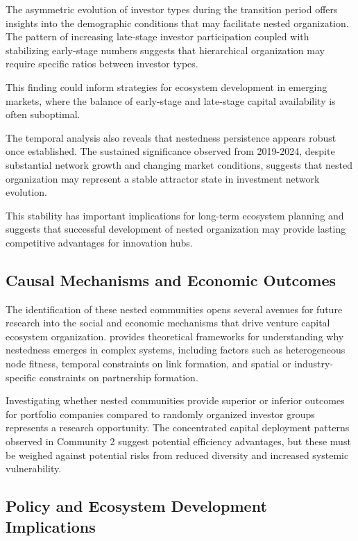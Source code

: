 The asymmetric evolution of investor types during the transition period offers insights into the demographic conditions that may facilitate nested organization. The pattern of increasing late-stage investor participation coupled with stabilizing early-stage numbers suggests that hierarchical organization may require specific ratios between investor types. 

This finding could inform strategies for ecosystem development in emerging markets, where the balance of early-stage and late-stage capital availability is often suboptimal.

The temporal analysis also reveals that nestedness persistence appears robust once established. The sustained significance observed from 2019-2024, despite substantial network growth and changing market conditions, suggests that nested organization may represent a stable attractor state in investment network evolution. 

This stability has important implications for long-term ecosystem planning and suggests that successful development of nested organization may provide lasting competitive advantages for innovation hubs.

\subsection{Causal Mechanisms and Economic Outcomes}

The identification of these nested communities opens several avenues for future research into the social and economic mechanisms that drive venture capital ecosystem organization. \cite{Mariani2019} provides theoretical frameworks for understanding why nestedness emerges in complex systems, including factors such as heterogeneous node fitness, temporal constraints on link formation, and spatial or industry-specific constraints on partnership formation.

Investigating whether nested communities provide superior or inferior outcomes for portfolio companies compared to randomly organized investor groups represents a research opportunity. The concentrated capital deployment patterns observed in Community 2 suggest potential efficiency advantages, but these must be weighed against potential risks from reduced diversity and increased systemic vulnerability.

\subsection{Policy and Ecosystem Development Implications}


